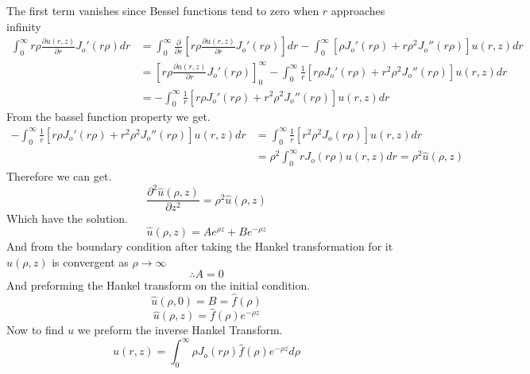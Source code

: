 The first term vanishes since Bessel functions tend to zero when $r$ approaches infinity
\begin{align*}
\int_{0}^{\infty} r\rho\frac{\partial u(r,z)}{\partial r} J_o'(r\rho)dr
&= \int_{0}^{\infty} \frac{\partial}{\partial r}\left[ r\rho\frac{\partial u(r,z)}{\partial r} J_o'(r\rho)\right]dr 
- \int_{0}^{\infty} \left[\rho J_o'(r\rho)+ r\rho^2 J_o''(r\rho)\right] u(r,z)dr
\\
&= \left[ r\rho\frac{\partial u(r,z)}{\partial r} J_o'(r\rho)\right]_{0}^{\infty} - \int_{0}^{\infty} \frac{1}{r}\left[r\rho J_o'(r\rho)+ r^2\rho^2 J_o''(r\rho)\right] u(r,z)dr
\\
&= - \int_{0}^{\infty} \frac{1}{r}\left[r\rho J_o'(r\rho)+ r^2\rho^2 J_o''(r\rho)\right] u(r,z)dr
\end{align*}
From the bassel function property we get.
\begin{align*}
- \int_{0}^{\infty} \frac{1}{r}\left[r\rho J_o'(r\rho)+ r^2\rho^2 J_o''(r\rho)\right] u(r,z)dr &= \int_{0}^{\infty} \frac{1}{r}\left[r^2\rho^2 J_o(r\rho)\right] u(r,z)dr
\\
&= \rho^2 \int_{0}^{\infty} r J_o(r\rho) u(r,z)dr = \rho^2 \hat{u}(\rho,z)
\end{align*}
Therefore we can get.
\[
    \frac{\partial^2 \hat{u}(\rho,z)}{\partial z^2} = \rho^2 \hat{u}(\rho,z)    
\]
Which have the solution. 
\[
\hat{u}(\rho,z) = A e^{\rho z} + Be^{-\rho z}    
\]
And from the boundary condition after taking the Hankel transformation for it $\hat{u}(\rho,z)$ is convergent as $\rho \to \infty$
\[
\therefore A = 0    
\]
And preforming the Hankel transform on the initial condition.
\[
\hat{u}(\rho,0) = B = \hat{f}(\rho)    
\]
\[
\hat{u}(\rho,z) = \hat{f}(\rho)e^{-\rho z}    
\]
Now to find $u$ we preform the inverse Hankel Transform.
\[
u(r,z) = \int_{0}^{\infty} \rho J_o(r\rho)\hat{f}(\rho)e^{-\rho z} d\rho    
\]

\newpage
\setcounter{equation}{0}
